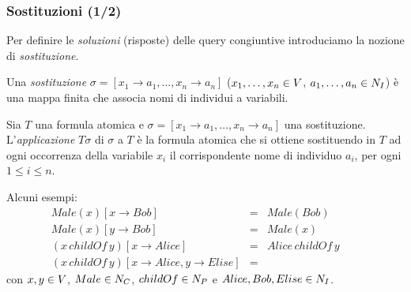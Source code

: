 \documentclass[8pt]{beamer}
\begin{document}
\begin{frame}
\frametitle{Sostituzioni (1/2)}

Per definire le \emph{soluzioni} (risposte) delle query congiuntive introduciamo la
nozione di \emph{sostituzione}.
\vspace{\baselineskip}

Una \emph{sostituzione} $\sigma=[x_1 \rightarrow a_1, \ldots, x_n \rightarrow a_n]$
($x_1, \ldots, x_n \in V$, $a_1, \ldots, a_n \in N_I$)
\`e una mappa finita che associa nomi di individui a variabili.
\vspace{\baselineskip}

Sia $T$ una formula atomica e $\sigma=[x_1 \rightarrow a_1, \ldots, x_n \rightarrow a_n]$
una sostituzione. L'\emph{applicazione} $T\sigma$ di $\sigma$ a $T$ \`e la formula atomica
che si ottiene sostituendo in $T$ ad ogni occorrenza della variabile $x_i$ il
corrispondente nome di individuo $a_i$, per ogni $1\leq i\leq n$.
\vspace{\baselineskip}

Alcuni esempi:
\[
 \begin{array}{lcl}
  Male(x)[x \rightarrow Bob] & = & Male(Bob) \\
  Male(x)[y \rightarrow Bob] & = & Male(x) \\
  (x\,childOf\,y)[x \rightarrow Alice] & = & Alice\,childOf\,y \\
  (x\,childOf\,y)[x \rightarrow Alice, y \rightarrow Elise] & = & \phantom{Alice\,childOf\,Elise}
 \end{array}
\]
con $x,y \in V$, $Male \in N_C$, $childOf \in N_P$ e $Alice, Bob, Elise \in N_I$.
\end{frame}
\end{document}
